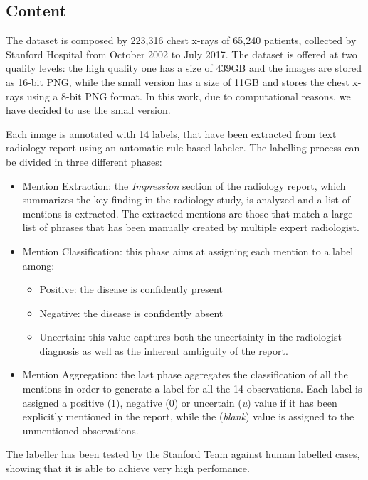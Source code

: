 \subsection{Content}
\label{sec:dataset_content}
The dataset is composed by 223,316 chest x-rays of 65,240 patients, collected by Stanford Hospital from October 2002 to July 2017.
The dataset is offered at two quality levels: the high quality one has a size of 439GB and the images are stored as 16-bit PNG, while the small version has a size of 11GB and stores the chest x-rays using a 8-bit PNG format. In this work, due to computational reasons, we have decided to use the small version.

\noindent Each image is annotated with 14 labels, that have been extracted from text radiology report using an automatic rule-based labeler. The labelling process can be divided in three different phases:
\begin{itemize}
    \item Mention Extraction: the \textit{Impression} section of the radiology report, which summarizes the key finding in the radiology study, is analyzed and a list of mentions is extracted. The extracted mentions are those that match a large list of phrases that has been manually created by multiple expert radiologist.
    \item Mention Classification: this phase aims at assigning each mention to a label among:
    \begin{itemize}
        \item Positive: the disease is confidently present
        \item Negative: the disease is confidently absent
        \item Uncertain: this value captures both the uncertainty in the radiologist diagnosis as well as the inherent ambiguity of the report.
    \end{itemize}
    \item Mention Aggregation: the last phase aggregates the classification of all the mentions in order to generate a label for all the 14 observations. Each label is assigned a positive (1), negative (0) or uncertain (\textit{u}) value if it has been explicitly mentioned in the report, while the (\textit{blank}) value is assigned to the unmentioned observations. 
\end{itemize}

\noindent The labeller has been tested by the Stanford Team against human labelled cases, showing that it is able to achieve very high perfomance.

